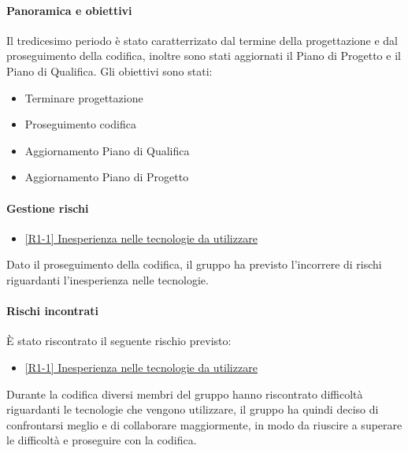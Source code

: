 \documentclass[a4paper,12pt]{article}
\begin{document}
            \paragraph{Panoramica e obiettivi}
            Il tredicesimo periodo è stato caratterrizato dal termine della progettazione e dal proseguimento della codifica, inoltre sono stati aggiornati il Piano di Progetto e il Piano di Qualifica. Gli obiettivi sono stati:
            \begin{itemize}
                \item Terminare progettazione
                \item Proseguimento codifica
                \item Aggiornamento Piano di Qualifica
                \item Aggiornamento Piano di Progetto
            \end{itemize}
            
            \paragraph{Gestione rischi}
                \begin{itemize}
                \item\hyperref[tab:r1]{[R1-1] Inesperienza nelle tecnologie da utilizzare}
                \end{itemize}
                Dato il proseguimento della codifica, il gruppo ha previsto l'incorrere di rischi riguardanti l'inesperienza nelle tecnologie.
    
                \paragraph*{Rischi incontrati}
                È stato riscontrato il seguente rischio previsto:
                \begin{itemize}
                    \item \hyperref[tab:r1]{[R1-1] Inesperienza nelle tecnologie da utilizzare}
                \end{itemize}
                Durante la codifica diversi membri del gruppo hanno riscontrato difficoltà riguardanti le tecnologie che vengono utilizzare, il gruppo ha quindi deciso di confrontarsi meglio e di collaborare maggiormente, in modo da riuscire a superare le difficoltà e proseguire con la codifica.
                
                
\end{document}
